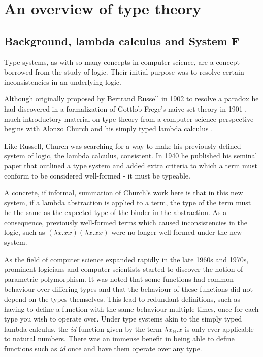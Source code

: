 \chapter{An overview of type theory}

        \section{Background, lambda calculus and System F}

          Type systems, as with so many concepts in computer science,
          are a concept borrowed from the study of logic. Their initial
          purpose was to resolve certain inconsistencies in an
          underlying logic. 
      
          Although originally proposed by Bertrand Russell in 1902 to
          resolve a paradox he had discovered in a formalization of
          Gottlob Frege's naive set theory in 1901 \cite{Russell1901}, much
          introductory material on type theory from a computer science
          perspective begins with Alonzo Church and his simply typed
          lambda calculus \cite{church1940}.
          
          Like Russell, Church was searching for a way to make his
          previously defined system of logic, the lambda calculus,
          consistent. In 1940 he published his seminal paper that outlined a
          type system and added extra criteria to which a term must
          conform to be considered well-formed - it must be typeable.
      
          A concrete, if informal, summation of Church's work here is that
          in this new system, if a lambda abstraction is applied to a term,
          the type of the term must be the same as the expected type
          of the binder in the abstraction. As a consequence,
          previously well-formed terms which caused inconsistencies in
          the logic, such as $ (\lambda x.xx)(\lambda x.xx) $ were no
          longer well-formed under the new system.
          
          As the field of computer science expanded rapidly in
          the late 1960s and 1970s, prominent logicians and computer
          scientists started to discover the notion of parametric
          polymorphism. It was noted that some functions had common
          behaviour over differing types and that the behaviour of these
          functions did not depend on the types themselves. This lead to
          redundant definitions, such as having to define a function with the
          same behaviour multiple times, once for each type you wish to
          operate over. Under type systems akin to the simply typed lambda
          calculus, the \emph{id} function given by the term $\lambda
          x_{\mathbb{N}}.x $ is only ever applicable to natural
          numbers. There was an immense benefit in being able to define 
          functions such as \emph{id} once and have them operate over any type.
      
